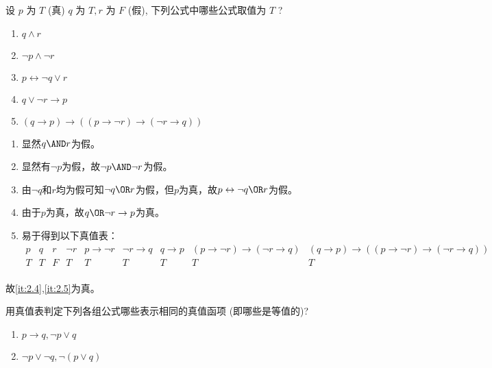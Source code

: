 \documentclass{ctexart}
\begin{document}
\begin{problem}\label{pro:2}
  设 $p$ 为 $T$ (真) $q$ 为 $T, r$ 为 $F$ (假), 下列公式中哪些公式取值为 $T$ ?
  \begin{enumerate}
    \item \label{it:2.1} $q \wedge r$
    \item \label{it:2.2}$\neg p \wedge \neg r$
    \item \label{it:2.3}$p \leftrightarrow \neg q \vee r$
    \item \label{it:2.4}$q \vee \neg r \rightarrow p$
    \item \label{it:2.5}$(q \rightarrow p) \rightarrow((p \rightarrow \neg r) \rightarrow(\neg r \rightarrow q))$
  \end{enumerate}
\end{problem}
\begin{solution}
  \begin{enumerate}
    \item 显然\(q \AND r\)为假。
    \item 显然有\(\neg p\)为假，故\(\neg p \AND \neg r\)为假。
    \item 由\(\neg q\)和\(r\)均为假可知\(\neg q \OR r\)为假，但\(p\)为真，故\(p \leftrightarrow \neg q \OR r\)为假。
    \item 由于\(p\)为真，故\(q \OR \neg r \to p\)为真。
    \item 易于得到以下真值表：
      \[
        \begin{matrix}
          p & q & r & \neg r & p \to \neg r & \neg r \to q & q \to p & (p \to \neg r) \to (\neg r \to q) & (q \to p)\to ((p \to \neg r) \to (\neg r \to q)) \\
          T & T & F & T      & T            & T            & T       & T                                 & T                                                \\
        \end{matrix}
      \]
  \end{enumerate}
  故\ref{it:2.4},\ref{it:2.5}为真。
\end{solution}
\begin{problem}\label{pro:3}
  用真值表判定下列各组公式哪些表示相同的真值函项 (即哪些是等值的)?
  \begin{enumerate}
    \item $p \rightarrow q, \neg p \vee q$
    \item $\neg p \vee \neg q, \neg(p \vee q)$
  \end{enumerate}

\end{problem}
\end{document}

